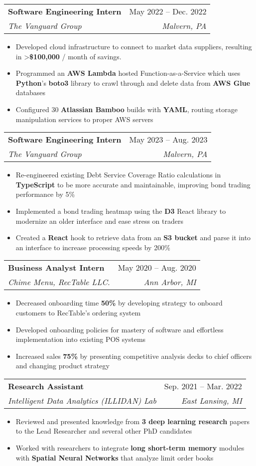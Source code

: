 \documentclass[letterpaper,11pt]{article}
\makeatletter
\newcommand{\resumeItem}[1]{
  \item\small{
    {#1 \vspace{-2pt}}
  }
}
\newcommand{\resumeSubheading}[4]{
  \vspace{-2pt}\item
    \begin{tabular*}{0.97\textwidth}[t]{l@{\extracolsep{\fill}}r}
      \textbf{#1} & #2 \\
      \textit{\small#3} & \textit{\small #4} \\
    \end{tabular*}\vspace{-7pt}
}
\newcommand{\resumeSubSubheading}[2]{
    \item
    \begin{tabular*}{0.97\textwidth}{l@{\extracolsep{\fill}}r}
      \textit{\small#1} & \textit{\small #2} \\
    \end{tabular*}\vspace{-7pt}
}
\newcommand{\resumeSubHeadingListEnd}{\end{itemize}}
\newcommand{\resumeItemListStart}{\begin{itemize}}
\newcommand{\resumeItemListEnd}{\end{itemize}\vspace{-5pt}}
\makeatother
\begin{document}

    \resumeSubheading
      {Software Engineering Intern}{May 2022 -- Dec. 2022}
      {The Vanguard Group}{Malvern, PA}
      \resumeItemListStart
        \resumeItem{Developed cloud infrastructure to connect to market data suppliers, resulting in \textgreater \textbf{\$100,000} / month of savings.}
        \resumeItem{Programmed an \textbf{AWS Lambda} hosted Function-as-a-Service which uses \textbf{Python}'s \textbf{boto3} library to crawl through and delete data from \textbf{AWS Glue} databases}
        \resumeItem{Configured 30 \textbf{Atlassian Bamboo} builds with \textbf{YAML}, routing storage manipulation services to proper AWS servers}
      \resumeItemListEnd

    \resumeSubheading
      {Software Engineering Intern}{May 2023 -- Aug. 2023}
      {The Vanguard Group}{Malvern, PA}
      \resumeItemListStart
        \resumeItem{Re-engineered existing Debt Service Coverage Ratio calculations in \textbf{TypeScript} to be more accurate and maintainable, improving bond trading performance by 5\%}
        \resumeItem{Implemented a bond trading heatmap using the \textbf{D3} React library to modernize an older interface and ease stress on traders}
        \resumeItem{Created a \textbf{React} hook to retrieve data from an \textbf{S3 bucket} and parse it into an interface to increase processing speeds by 200\%}
    \resumeItemListEnd
      
    \resumeSubheading
        {Business Analyst Intern}{May 2020 -- Aug. 2020}
        {Chime Menu, RecTable LLC.}{Ann Arbor, MI}
        \resumeItemListStart
            \resumeItem{Decreased onboarding time \textbf{50\%} by developing strategy to onboard customers to RecTable's ordering system}
            \resumeItem{Developed onboarding policies for mastery of software and effortless implementation into existing POS systems}
            \resumeItem{Increased sales \textbf{75\%} by presenting competitive analysis decks to chief officers and changing product strategy}
    \resumeItemListEnd

    \resumeSubheading
      {Research Assistant}{Sep. 2021 -- Mar. 2022}
      {Intelligent Data Analytics (ILLIDAN) Lab}{East Lansing, MI}
      \resumeItemListStart
        \resumeItem{Reviewed and presented knowledge from \textbf{3 deep learning research} papers to the Lead Researcher and several other PhD candidates}
        \resumeItem{Worked with researchers to integrate \textbf{long short-term memory} modules with \textbf{Spatial Neural Networks} that analyze limit order books}
    \resumeItemListEnd
\end{document}
